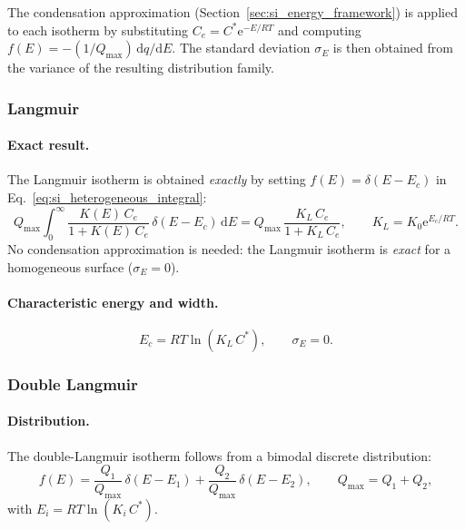 \documentclass[journal=aamick,manuscript=article]{achemso}
\begin{document}
The condensation approximation (Section~\ref{sec:si_energy_framework}) is applied
to each isotherm by substituting $C_e = C^{\ast}\mathrm{e}^{-E/RT}$ and computing
$f(E) = -(1/Q_{\max})\,\mathrm{d}q/\mathrm{d}E$. The standard deviation $\sigma_E$
is then obtained from the variance of the resulting distribution family.

\subsubsection{Langmuir}

\paragraph{Exact result.}
The Langmuir isotherm is obtained \emph{exactly} by setting
$f(E) = \delta(E-E_c)$ in Eq.~\eqref{eq:si_heterogeneous_integral}:
\begin{equation}
	Q_{\max}\int_0^{\infty}\frac{K(E)\,C_e}{1+K(E)\,C_e}
	\,\delta(E-E_c)\,\mathrm{d}E
	= Q_{\max}\,\frac{K_L\,C_e}{1+K_L\,C_e},
	\qquad K_L = K_0\mathrm{e}^{E_c/RT}.
\end{equation}
No condensation approximation is needed: the Langmuir isotherm is \emph{exact}
for a homogeneous surface ($\sigma_E = 0$).

\paragraph{Characteristic energy and width.}
\begin{equation}
	E_c = RT\ln(K_L\,C^{\ast}), \qquad \sigma_E = 0.
\end{equation}

\subsubsection{Double Langmuir}

\paragraph{Distribution.}
The double-Langmuir isotherm follows from a bimodal discrete distribution:
\begin{equation}
	f(E) = \frac{Q_1}{Q_{\max}}\,\delta(E-E_1)
	     + \frac{Q_2}{Q_{\max}}\,\delta(E-E_2),
	\qquad Q_{\max} = Q_1+Q_2,
\end{equation}
with $E_i = RT\ln(K_i\,C^{\ast})$.
\end{document}
